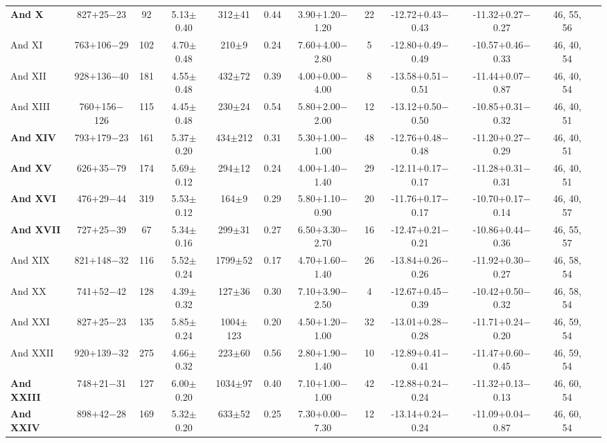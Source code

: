 \begin{table*}
\begin{center}
{\begin{tabular}{lccccccccccc}
\textbf{And X} & 827$+$25$-$23 & 92 & 5.13$\pm$0.40 & 312$\pm$41 & 0.44 & 3.90$+$1.20$-$1.20 & 22 & -12.72$+$0.43$-$0.43 & -11.32$+$0.27$-$0.27 & 46, 55, 56\\
And XI & 763$+$106$-$29 & 102 & 4.70$\pm$0.48 & 210$\pm$9 & 0.24 & 7.60$+$4.00$-$2.80 & 5 & -12.80$+$0.49$-$0.49 & -10.57$+$0.46$-$0.33 & 46, 40, 54\\
And XII & 928$+$136$-$40 & 181 & 4.55$\pm$0.48 & 432$\pm$72 & 0.39 & 4.00$+$0.00$-$4.00 & 8 & -13.58$+$0.51$-$0.51 & -11.44$+$0.07$-$0.87 & 46, 40, 54\\
And XIII & 760$+$156$-$126 & 115 & 4.45$\pm$0.48 & 230$\pm$24 & 0.54 & 5.80$+$2.00$-$2.00 & 12 & -13.12$+$0.50$-$0.50 & -10.85$+$0.31$-$0.32 & 46, 40, 51\\
\textbf{And XIV} & 793$+$179$-$23 & 161 & 5.37$\pm$0.20 & 434$\pm$212 & 0.31 & 5.30$+$1.00$-$1.00 & 48 & -12.76$+$0.48$-$0.48 & -11.20$+$0.27$-$0.29 & 46, 40, 51\\
\textbf{And XV} & 626$+$35$-$79 & 174 & 5.69$\pm$0.12 & 294$\pm$12 & 0.24 & 4.00$+$1.40$-$1.40 & 29 & -12.11$+$0.17$-$0.17 & -11.28$+$0.31$-$0.31 & 46, 40, 51\\
\textbf{And XVI} & 476$+$29$-$44 & 319 & 5.53$\pm$0.12 & 164$\pm$9 & 0.29 & 5.80$+$1.10$-$0.90 & 20 & -11.76$+$0.17$-$0.17 & -10.70$+$0.17$-$0.14 & 46, 40, 57\\
\textbf{And XVII} & 727$+$25$-$39 & 67 & 5.34$\pm$0.16 & 299$\pm$31 & 0.27 & 6.50$+$3.30$-$2.70 & 16 & -12.47$+$0.21$-$0.21 & -10.86$+$0.44$-$0.36 & 46, 55, 57\\
And XIX & 821$+$148$-$32 & 116 & 5.52$\pm$0.24 & 1799$\pm$52 & 0.17 & 4.70$+$1.60$-$1.40 & 26 & -13.84$+$0.26$-$0.26 & -11.92$+$0.30$-$0.27 & 46, 58, 54\\
And XX & 741$+$52$-$42 & 128 & 4.39$\pm$0.32 & 127$\pm$36 & 0.30 & 7.10$+$3.90$-$2.50 & 4 & -12.67$+$0.45$-$0.39 & -10.42$+$0.50$-$0.32 & 46, 58, 54\\
And XXI & 827$+$25$-$23 & 135 & 5.85$\pm$0.24 & 1004$\pm$123 & 0.20 & 4.50$+$1.20$-$1.00 & 32 & -13.01$+$0.28$-$0.28 & -11.71$+$0.24$-$0.20 & 46, 59, 54\\
And XXII & 920$+$139$-$32 & 275 & 4.66$\pm$0.32 & 223$\pm$60 & 0.56 & 2.80$+$1.90$-$1.40 & 10 & -12.89$+$0.41$-$0.41 & -11.47$+$0.60$-$0.45 & 46, 59, 54\\
\textbf{And XXIII} & 748$+$21$-$31 & 127 & 6.00$\pm$0.20 & 1034$\pm$97 & 0.40 & 7.10$+$1.00$-$1.00 & 42 & -12.88$+$0.24$-$0.24 & -11.32$+$0.13$-$0.13 & 46, 60, 54\\
\textbf{And XXIV} & 898$+$42$-$28 & 169 & 5.32$\pm$0.20 & 633$\pm$52 & 0.25 & 7.30$+$0.00$-$7.30 & 12 & -13.14$+$0.24$-$0.24 & -11.09$+$0.04$-$0.87 & 46, 60, 54\\

\end{tabular}}
\end{center}
\end{table*}
